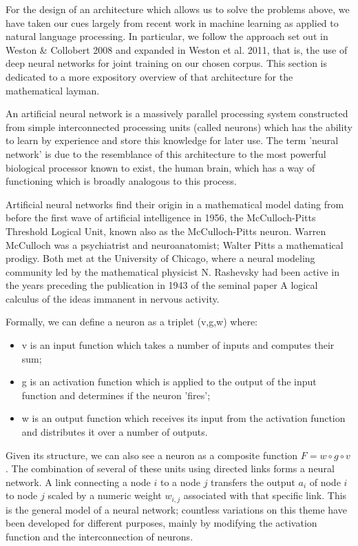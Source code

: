 For the design of an architecture which allows us to solve the
problems above, we have taken our cues largely from recent work in
machine learning as applied to natural language processing. In
particular, we follow the approach set out in Weston \& Collobert 2008
and expanded in Weston et al. 2011, that is, the use of deep neural
networks for joint training on our chosen corpus. This section is
dedicated to a more expository overview of that architecture for the
mathematical layman.

An artificial neural network is a massively parallel processing system
constructed from simple interconnected processing units (called
neurons) which has the ability to learn by experience and store this
knowledge for later use. The term 'neural network' is due to the
resemblance of this architecture to the most powerful biological
processor known to exist, the human brain, which has a way of
functioning which is broadly analogous to this process. 

Artificial neural networks find their origin in a mathematical model
dating from before the first wave of artificial intelligence in 1956,
the McCulloch-Pitts Threshold Logical Unit, known also as the
McCulloch-Pitts neuron. Warren McCulloch was a psychiatrist and
neuroanatomist; Walter Pitts a mathematical prodigy. Both met at the
University of Chicago, where a neural modeling community led by the
mathematical physicist N. Rashevsky had been active in the years
preceding the publication in 1943 of the seminal paper A logical
calculus of the ideas immanent in nervous activity. 

Formally, we can define a neuron as a triplet (v,g,w) where:

\begin{itemize}
\item v is an input function which takes a number of inputs and computes their sum;
\item g is an activation function which is applied to the output of the input function and determines if the neuron 'fires';
\item w is an output function which receives its input from the activation
  function and distributes it over a number of outputs.
\end{itemize}

Given its structure, we can also see a neuron as a composite function
$F = w \circ g \circ v$. The combination of several of these units
using directed links forms a neural network. A link connecting a node
$i$ to a node $j$ transfers the output $a_i$ of node $i$ to node $j$
scaled by a numeric weight $w_{i,j}$ associated with that specific
link. This is the general model of a neural network; countless
variations on this theme have been developed for different purposes,
mainly by modifying the activation function and the interconnection of
neurons.

